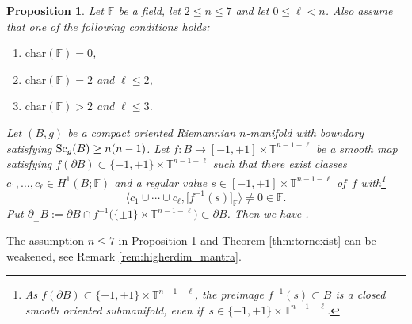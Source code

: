 \documentclass[pdftex]{sigma}
\numberwithin{equation}{section}
\newtheorem{Proposition}[Theorem]{Proposition}
\newcommand{\F}{\mathbb{F}}
\newcommand{\TTT}{\mathbb{T}}
\newcommand{\charac}{\mathrm{char}}
\newcommand{\Sc}{{\rm Sc}}
\newcommand{\myicon}{$\,\,\,\triangleright$}
\begin{document}
\begin{Proposition} \label{prop:bandwidth} Let $\F$ be a field, let $2 \leq n \leq 7$ and let $0 \leq \ell < n$.
Also assume that one of the following conditions holds:
\begin{enumerate}[\myicon]\itemsep=0pt
 \item $\charac(\F) = 0$,
 \item $\charac(\F) = 2$ and $\ell \leq 2$,
 \item $\charac(\F) > 2$ and $\ell \leq 3$.
\end{enumerate}

Let $(B, g)$ be a compact oriented Riemannian $n$-manifold with boundary satisfying $\Sc_g(B) \geq n(n-1)$.
Let
$
 f \colon B \to [-1, +1] \times {\TTT}^{n- 1 -\ell}
$
be a smooth map satisfying $f(\partial B) \subset \{ -1, +1\} \times {\TTT}^{n- 1-\ell}$ such that there exist classes $c_1, \ldots, c_\ell \in H^{1}(B; \F)$ and a regular value $s \in [-1, +1] \times {\TTT}^{n- 1 -\ell}$ of~$f$ with\footnote{As $f(\partial B) \subset \{-1, +1\} \times {\TTT}^{n-1-\ell}$, the preimage $f^{-1}(s) \subset B$ is a closed smooth oriented submanifold, even if~${s \in \{ -1, +1\} \times \TTT^{n-1-\ell}}$.}
\[
\big\langle c_1 \cup \cdots \cup c_\ell, \big[f^{-1}(s) \big]_\F \big\rangle \neq 0 \in \F .
\]
Put $\partial_{\pm} B:= \partial B \cap f^{-1}\big( \{ \pm 1\} \times {\TTT}^{n- 1-\ell} \big) \subset \partial B$.
Then we have .
\end{Proposition}

\begin{Remark} The assumption $n \leq 7$ in Proposition \ref{prop:bandwidth} and Theorem \ref{thm:tornexist} can be weakened, see Remark \ref{rem:higherdim_mantra}.
\end{Remark}
\end{document}
